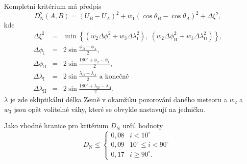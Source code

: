 \medskip

Kompletní kritérium má předpis \cite{newapproach}
\begin{equation}
    D_\text{N}^2(A,B)=\left( U_B - U_A \right)^2 + w_1\left( \cos{\theta_B} - \cos{\theta_A} \right)^2 + \Delta\xi^2 \text{,}
\end{equation}
kde
\begin{eqnarray}
    \Delta\xi^2 &=& \min{\left\{ \left( w_2\Delta\phi_\text{I}^2 + w_3\Delta\lambda_\text{I}^2 \right),\;
                                 \left( w_2\Delta\phi_\text{II}^2 + w_3\Delta\lambda_\text{II}^2 \right) \right\}} \text{,}\\
    \Delta\phi_\text{I} &=& 2\sin{\frac{\phi_B-\phi_A}{2}} \text{,}\\
    \Delta\phi_\text{II} &=& 2\sin{\frac{180^\circ+\phi_2-\phi_1}{2}} \text{,}\\
    \Delta\lambda_\text{I} &=& 2\sin{\frac{\lambda_B-\lambda_A}{2}} \text{ a konečně}\\
    \Delta\lambda_\text{II} &=& 2\sin{\frac{180^\circ+\lambda_B-\lambda_A}{2}} \text{.}
\end{eqnarray}
$\lambda$ je zde ekliptikální délka Země v okamžiku pozorování daného meteoru a $w_2$ a $w_3$ jsou opět volitelné váhy, které se obvykle nastavují na jedničku.

Jako vhodné hranice pro kritérium $D_\text{N}$ určil \citeauthor{galligan} hodnoty \cite{galligan}
$$
    D_\text{N} \le \begin{cases}
        0{,}08 & i < 10^\circ \\
        0{,}09 & 10^\circ \le i < 90^\circ \\
        0{,}17 & i \ge 90^\circ \text{.}
    \end{cases}
$$